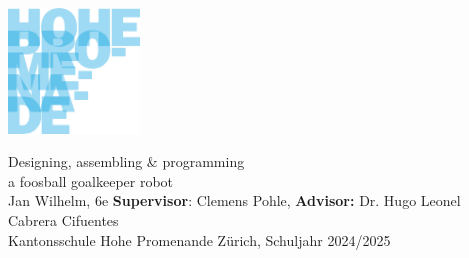 \documentclass[paperheight=140cm,paperwidth=100cm,portrait]{./baposter}
\begin{document}
\begin{poster}
{        \noindent
        \begin{minipage}{.1\linewidth}
            \includegraphics[width=3.5cm]{../../photos/hopro_logo}
        \end{minipage}%
        \begin{minipage}{.05\linewidth}
        \end{minipage}
        \begin{minipage}{.9\linewidth}
            \centering
            \textsf{
                \fontsize{30}{8}\selectfont
                Designing, assembling \& programming \\a foosball goalkeeper robot
            }\\
            \sf\vspace{0.5em}
            \fontsize{18}{8}\selectfont
            Jan Wilhelm, 6e \hspace{0.3cm} \textbf{Supervisor}: Clemens Pohle, \textbf{Advisor:} Dr. Hugo Leonel Cabrera Cifuentes\\ \vspace{0.5cm} \selectfont Kantonsschule Hohe Promenande Zürich, Schuljahr 2024/2025
        \end{minipage}
        \vspace{1cm}

    } %
    {
    }


\end{poster}
\end{document}
